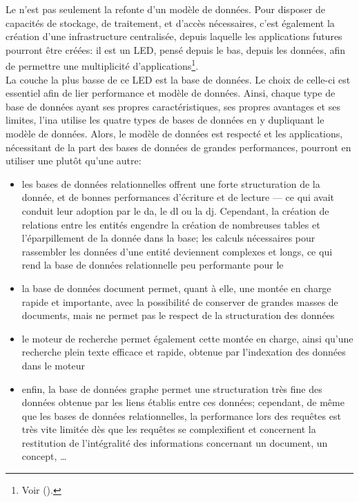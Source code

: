 Le \ldd n'est pas seulement la refonte d'un modèle de données. Pour disposer de capacités de stockage, de traitement, et d'accès nécessaires, c'est également la création d'une infrastructure centralisée, depuis laquelle les applications futures pourront être créées: il est un LED, pensé depuis le bas, depuis les données, afin de permettre une multiplicité d'applications\footnote{Voir  ().}.\\

La couche la plus basse de ce LED est la base de données. Le choix de celle-ci est essentiel afin de lier performance et modèle de données. Ainsi, chaque type de base de données ayant ses propres caractéristiques, ses propres avantages et ses limites, l'\ac{ina} utilise les quatre types de bases de données en y dupliquant le modèle de données. Alors, le modèle de données est respecté et les applications, nécessitant de la part des bases de données de grandes performances, pourront en utiliser une plutôt qu'une autre:
\begin{itemize}
	\item les bases de données relationnelles offrent une forte structuration de la donnée, et de bonnes performances d'écriture et de lecture --- ce qui avait conduit leur adoption par le \ac{da}, le \ac{dl} ou la \ac{dj}. Cependant, la création de relations entre les entités engendre la création de nombreuses tables et l'éparpillement de la donnée dans la base; les calculs nécessaires pour rassembler les données d'une entité deviennent complexes et longs, ce qui rend la base de données relationnelle peu performante pour le \ldd
	\item la base de données document permet, quant à elle, une montée en charge rapide et importante, avec la possibilité de conserver de grandes masses de documents, mais ne permet pas le respect de la structuration des données
	\item le moteur de recherche permet également cette montée en charge, ainsi qu'une recherche plein texte efficace et rapide, obtenue par l'indexation des données dans le moteur
	\item enfin, la base de données graphe permet une structuration très fine des données obtenue par les liens établis entre ces données; cependant, de même que les bases de données relationnelles, la performance lors des requêtes est très vite limitée dès que les requêtes se complexifient et concernent la restitution de l'intégralité des informations concernant un document, un concept, \dots
\end{itemize}
\medskip
\medskip

